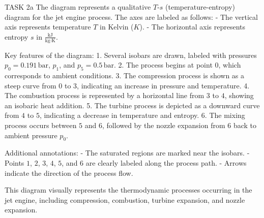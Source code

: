 TASK 2a  
The diagram represents a qualitative \( T \)-\( s \) (temperature-entropy) diagram for the jet engine process. The axes are labeled as follows:  
- The vertical axis represents temperature \( T \) in Kelvin (\( K \)).  
- The horizontal axis represents entropy \( s \) in \( \frac{\text{kJ}}{\text{kg·K}} \).  

Key features of the diagram:  
1. Several isobars are drawn, labeled with pressures \( p_0 = 0.191 \, \text{bar} \), \( p_1 \), and \( p_5 = 0.5 \, \text{bar} \).  
2. The process begins at point \( 0 \), which corresponds to ambient conditions.  
3. The compression process is shown as a steep curve from \( 0 \) to \( 3 \), indicating an increase in pressure and temperature.  
4. The combustion process is represented by a horizontal line from \( 3 \) to \( 4 \), showing an isobaric heat addition.  
5. The turbine process is depicted as a downward curve from \( 4 \) to \( 5 \), indicating a decrease in temperature and entropy.  
6. The mixing process occurs between \( 5 \) and \( 6 \), followed by the nozzle expansion from \( 6 \) back to ambient pressure \( p_0 \).  

Additional annotations:  
- The saturated regions are marked near the isobars.  
- Points \( 1 \), \( 2 \), \( 3 \), \( 4 \), \( 5 \), and \( 6 \) are clearly labeled along the process path.  
- Arrows indicate the direction of the process flow.  

This diagram visually represents the thermodynamic processes occurring in the jet engine, including compression, combustion, turbine expansion, and nozzle expansion.